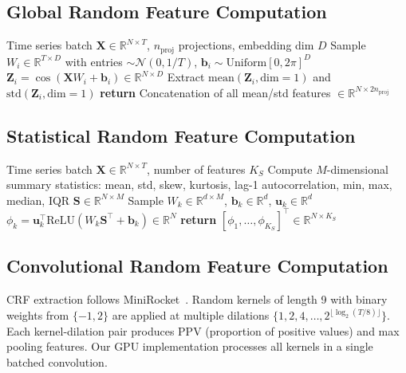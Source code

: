 \documentclass{article}
\begin{document}
\subsection{Global Random Feature Computation}

\begin{algorithmic}
\REQUIRE Time series batch $\mathbf{X} \in \mathbb{R}^{N \times T}$, $n_{\mathrm{proj}}$ projections, embedding dim $D$
  \STATE Sample $W_i \in \mathbb{R}^{T \times D}$ with entries $\sim \mathcal{N}(0, 1/T)$, $\mathbf{b}_i \sim \mathrm{Uniform}[0, 2\pi]^D$
  \STATE $\mathbf{Z}_i = \cos(\mathbf{X} W_i + \mathbf{b}_i) \in \mathbb{R}^{N \times D}$
  \STATE Extract $\mathrm{mean}(\mathbf{Z}_i, \mathrm{dim}{=}1)$ and $\mathrm{std}(\mathbf{Z}_i, \mathrm{dim}{=}1)$ 
\ENDFOR
\STATE \textbf{return} Concatenation of all mean/std features $\in \mathbb{R}^{N \times 2n_{\mathrm{proj}}}$
\end{algorithmic}

\subsection{Statistical Random Feature Computation}

\begin{algorithmic}
\REQUIRE Time series batch $\mathbf{X} \in \mathbb{R}^{N \times T}$, number of features $K_S$
\STATE Compute $M$-dimensional summary statistics: mean, std, skew, kurtosis, lag-1 autocorrelation, min, max, median, IQR
\STATE $\mathbf{S} \in \mathbb{R}^{N \times M}$
  \STATE Sample $W_k \in \mathbb{R}^{d \times M}$, $\mathbf{b}_k \in \mathbb{R}^d$, $\mathbf{u}_k \in \mathbb{R}^d$
  \STATE $\phi_k = \mathbf{u}_k^\top \mathrm{ReLU}(W_k \mathbf{S}^\top + \mathbf{b}_k) \in \mathbb{R}^N$ 
\ENDFOR
\STATE \textbf{return} $[\phi_1, \ldots, \phi_{K_S}]^\top \in \mathbb{R}^{N \times K_S}$
\end{algorithmic}

\subsection{Convolutional Random Feature Computation}

CRF extraction follows MiniRocket~\citep{dempster2021minirocket}.
Random kernels of length 9 with binary weights from $\{-1, 2\}$ are applied at multiple dilations $\{1, 2, 4, \ldots, 2^{\lfloor\log_2(T/8)\rfloor}\}$.
Each kernel-dilation pair produces PPV (proportion of positive values) and max pooling features.
Our GPU implementation processes all kernels in a single batched convolution.
\end{document}
